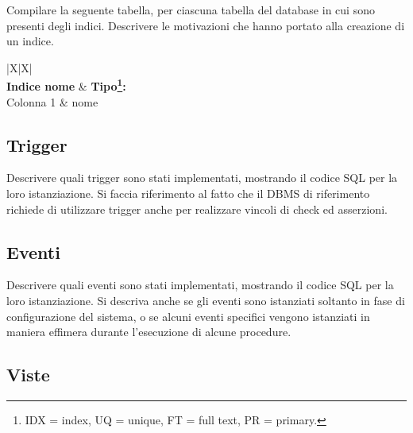 \begin{templateblock}
    Compilare la seguente tabella, per ciascuna tabella del database in cui
    sono presenti degli indici.
    Descrivere le motivazioni che hanno portato alla creazione di un indice.
\end{templateblock}

\begin{tabularx}{\linewidth}{|X|X|}
    \hline
                                     \\\hline
    \textbf{Indice \textlangle{}nome\textrangle{}} & \textbf{Tipo\footnote{IDX = index, UQ = unique, FT = full text, PR = primary.}:} \\\hline
    Colonna 1                                      & \textlangle{}nome\textrangle{}                                                   \\ \hline
\end{tabularx}

\subsection*{Trigger}

\begin{templateblock}
    Descrivere quali trigger sono stati implementati, mostrando il codice SQL
    per la loro istanziazione. Si faccia riferimento al fatto che il DBMS di
    riferimento richiede di utilizzare trigger anche per realizzare vincoli di
    check ed asserzioni.
\end{templateblock}

\subsection*{Eventi}

\begin{templateblock}
    Descrivere quali eventi sono stati implementati, mostrando il codice SQL
    per la loro istanziazione. Si descriva anche se gli eventi sono
    istanziati soltanto in fase di configurazione del sistema, o se alcuni
    eventi specifici vengono istanziati in maniera effimera durante
    l’esecuzione di alcune procedure.
\end{templateblock}

\subsection*{Viste}

